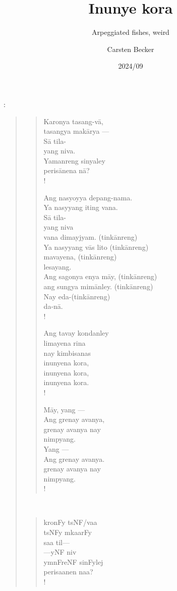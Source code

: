 \documentclass[12pt,paper=a4]{scrartcl}
\author{Carsten Becker}
\title{Inunye kora}
\subtitle{Arpeggiated fishes, weird}
\date{2024/09} %
\newenvironment{mytitle}{
	\hfill
	\begin{minipage}{0.667\textwidth}
	\vspace{\baselineskip}
	\begin{center}
		\Large
		\sffamily\bfseries
		\makeatletter
}{
		\makeatother
	\end{center}
	\vspace{1em}
	\end{minipage}
	\hfill
}
\begin{document}

\begin{mytitle}
	\@title: \@subtitle
\end{mytitle}

\begin{quote}
\begin{minipage}[t]{.5\linewidth}
\begin{verse}
\renewcommand*{\vrightskip}{-2em}
Karonya tasang-vā,\\
tasangya makārya ---\\
Sā tila-\\
yang niva.\\
Yamanreng sinyaley\\
perisānena nā?\\!

Ang nasyoyya depang-nama.\\
Ya nasyyang iting vana.\\
Sā tila-\\
yang niva\\
vana dimayjyam. (tinkānreng)\\
Ya nasyyang vās lito (tinkānreng)\\
mavayena, (tinkānreng)\\
lesayang.\\
Ang sagonya enya māy, (tinkānreng)\\
ang sungya mimānley. (tinkānreng)\\
Nay eda-(tinkānreng)\\
da-nā.\\!

Ang tavay kondanley\\
limayena rina\\
nay kimbisanas\\
inunyena kora,\\
inunyena kora,\\
inunyena kora.\\!

Māy, yang ---\\
Ang grenay avanya,\\
grenay avanya nay\\
nimpyang.\\
Yang ---\\
Ang grenay avanya.\\
grenay avanya nay\\
nimpyang.\\!
\end{verse}
\end{minipage}
~
\begin{minipage}[t]{.5\linewidth}
\Tagati %
\begin{verse}
kronFy tsNF/vaa\\
tsNFy mkaarFy\\
saa til—\\
—yNF niv\\
ymnFreNF sinFylej\\
perisaanen naa?\\!


\end{verse}
\end{minipage}
\end{quote}
\end{document}
